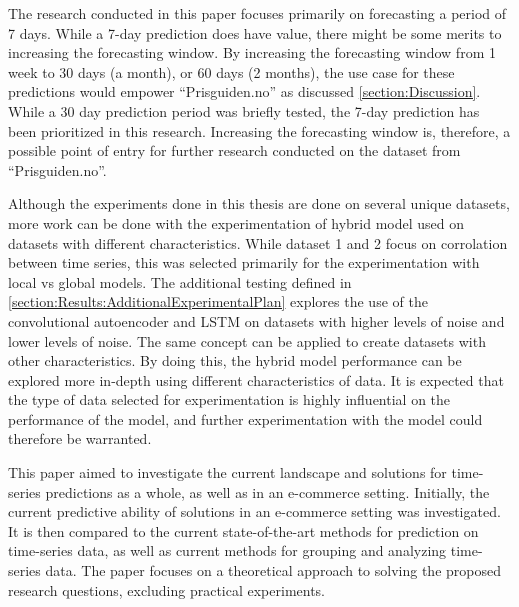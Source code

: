 The research conducted in this paper focuses primarily on forecasting a period of 7 days.
While a 7-day prediction does have value,
there might be some merits to increasing the forecasting window.
By increasing the forecasting window from 1 week to 30 days (a month), or 60 days (2 months),
the use case for these predictions would empower ``Prisguiden.no'' as discussed \cref{section:Discussion}.
While a 30 day prediction period was briefly tested,
the 7-day prediction has been prioritized in this research.
Increasing the forecasting window is, therefore, a possible point of entry for further research conducted on the
dataset from ``Prisguiden.no''.


Although the experiments done in this thesis are done on several unique datasets,
more work can be done with the experimentation of hybrid model used on datasets with different characteristics.
While dataset 1 and 2 focus on corrolation between time series, this was selected primarily for the experimentation with local vs global models.
The additional testing defined in \cref{section:Results:AdditionalExperimentalPlan} explores the use of the convolutional autoencoder and LSTM
on datasets with higher levels of noise and lower levels of noise.
The same concept can be applied to create datasets with other characteristics.
By doing this, the hybrid model performance can be explored more in-depth using different characteristics of data.
It is expected that the type of data selected for experimentation is highly influential on the performance of the model,
and further experimentation with the model could therefore be warranted.




\iffalse
This paper aimed to investigate the current landscape and solutions for time-series predictions as a whole,
as well as in an e-commerce setting.
Initially, the current predictive ability of solutions in an e-commerce setting was investigated.
It is then compared to the current state-of-the-art methods for prediction on time-series data,
as well as current methods for grouping and analyzing time-series data.
The paper focuses on a theoretical approach to solving the proposed research questions,
excluding practical experiments.

